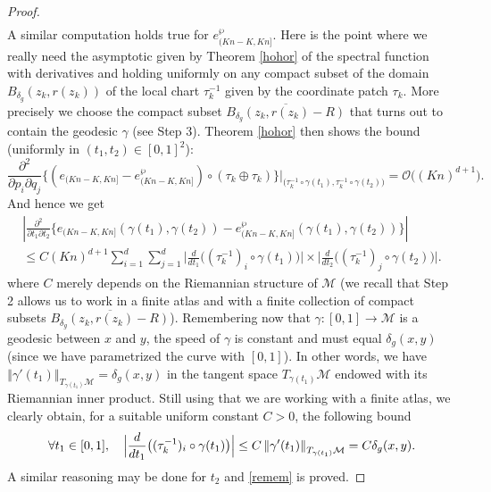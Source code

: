 \begin{proof}
\begin{multline*}
\end{multline*}
A similar computation holds true for $e_{(Kn-K,Kn]}^{\wp}$.
Here is the point where we really need the asymptotic given by Theorem \ref{hohor} of the spectral function with derivatives and holding uniformly on any compact subset of the domain $B_{\delta_g}(z_k,r(z_k))$ of the local chart $\tau_k^{-1}$ given by the coordinate patch $\tau_k$.
More precisely we choose the compact subset $\overline{B_{\delta_g}(z_k,r(z_k)-R)}$ that turns out to contain the geodesic $\gamma$ (see Step 3).
Theorem \ref{hohor} then shows the bound (uniformly in $(t_1,t_2)\in [0,1]^2$):
\begin{equation*}
\frac{\partial^2 }{\partial p_i \partial q_j} \Big\{ (e_{(Kn-K,Kn]}-e_{(Kn-K,Kn]}^{\wp})\circ (\tau_k\oplus \tau_k)\Big\}\Big\vert_{\big(\tau_k^{-1}\circ \gamma(t_1),\tau_k^{-1} \circ \gamma(t_2)\big)}=\mathcal{O}\bigl((Kn)^{d+1}\bigr).
\end{equation*}
And hence we get
\begin{multline*}
\left\vert \frac{\partial^2 }{\partial t_1 \partial t_2}\Big\{ e_{(Kn-K,Kn]}(\gamma(t_1),\gamma(t_2))-e_{(Kn-K,Kn]}^{\wp}(\gamma(t_1),\gamma(t_2))\Big\} \right\vert \\
\leq C(Kn)^{d+1} \sum_{i=1}^{d} \sum_{j=1}^d \Big\vert \frac{d}{dt_1} \Big((\tau_k^{-1})_i \circ \gamma(t_1)\Big) \Big\vert\times \Big\vert
\frac{d}{dt_2}\Big((\tau_k^{-1})_j \circ \gamma(t_2)\Big) \Big\vert.
\end{multline*}
where $C$ merely depends on the Riemannian structure of $\mathcal{M}$ (we recall that Step 2 allows us to work in a finite atlas and with a finite collection of compact subsets $\overline{B_{\delta_g}(z_k,r(z_k)-R)}$).
Remembering now that $\gamma:[0,1]\to \mathcal{M}$ is a geodesic between $x$ and $y$, the speed of $\gamma$ is constant and must equal $\delta_g(x,y)$ (since we have parametrized the curve with $[0,1]$). In other words, we have
$\left\Vert \gamma'(t_1)\right\Vert_{T_{\gamma(t_1)} \mathcal{M}}=\delta_g(x,y)$ in the tangent space $T_{\gamma(t_1)} \mathcal{M}$ endowed with its Riemannian inner product.
Still using that we are working with a finite atlas, we clearly obtain, for a suitable uniform constant $C>0$, the following bound\vspace*{-3pt}
\begin{equation*}
\forall t_1 \in [0,1],\quad \Bigl\vert \frac{d}{dt_1} \bigl((\tau_k^{-1})_i\circ \gamma(t_1)\bigr) \Bigr\vert\leq C\left\Vert \gamma'(t_1)\right\Vert_{T_{\gamma(t_1)} \mathcal{M}}=C\delta_g(x,y).
\end{equation*}
A similar reasoning may be done for $t_2$ and \eqref{remem} is proved.


\end{proof}
